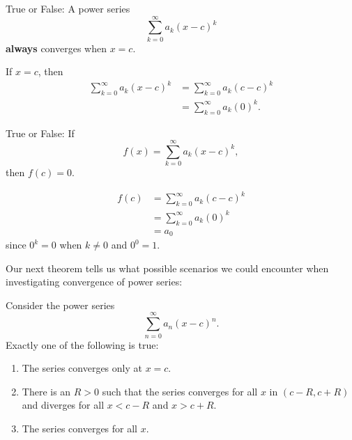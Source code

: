 \documentclass{ximera}
\begin{document}
\begin{question}
  True or False: A power series
  \[
  \sum_{k=0}^\infty a_k(x-c)^k
  \]
  \textbf{always} converges when $x=c$.
  \begin{prompt}
    \begin{multipleChoice}
    \end{multipleChoice}
  \end{prompt}
  \begin{feedback}
    If $x=c$, then
    \begin{align*}
      \sum_{k=0}^\infty a_k(x-c)^k &= \sum_{k=0}^\infty a_k(c-c)^k \\
      &= \sum_{k=0}^\infty a_k(0)^k.
    \end{align*}
  \end{feedback}
  \begin{question}
    True or False: If 
    \[
    f(x) = \sum_{k=0}^\infty a_k(x-c)^k,
    \]
    then $f(c) = 0$. 
  \begin{prompt}
    \begin{multipleChoice}
    \end{multipleChoice}
  \end{prompt}
  \begin{feedback}
    \begin{align*}
      f(c) &= \sum_{k=0}^\infty a_k(c-c)^k \\
      &= \sum_{k=0}^\infty a_k(0)^k\\
      &= a_0
    \end{align*}
    since $0^k = 0$ when $k\ne 0$ and $0^0 = 1$.
  \end{feedback} 
\end{question}
\end{question}

Our next theorem tells us what possible scenarios we could encounter
when investigating convergence of power series:

\begin{theorem}
  Consider the power series
  \[
  \sum_{n=0}^\infty a_n(x-c)^n.
  \]
  Exactly one of the following is true:
\begin{enumerate}
\item The series converges only at $x=c$.
\item There is an $R>0$ such that the series converges for all $x$ in	
  $(c-R,c+R)$ and diverges for all $x<c-R$ and $x>c+R$.
\item The series converges for all $x$.
\end{enumerate}
\end{theorem}
\end{document}
